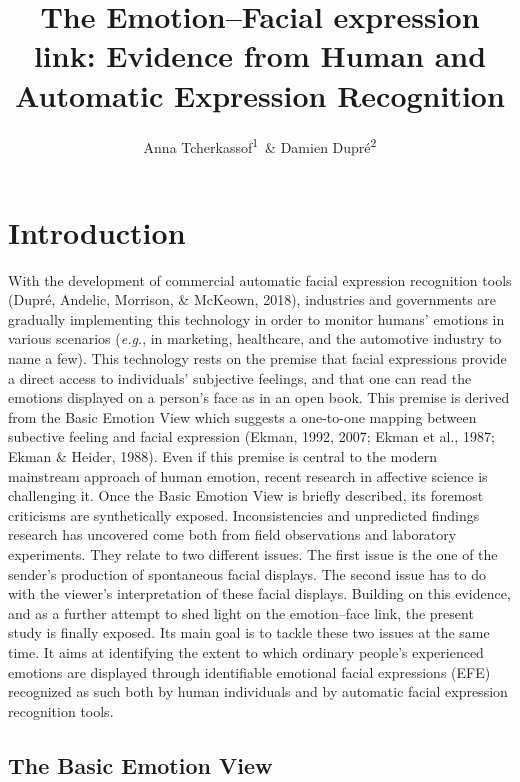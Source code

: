 \documentclass[man]{apa6}
\title{The Emotion--Facial expression link: Evidence from Human and Automatic Expression Recognition}
\author{Anna Tcherkassof\textsuperscript{1}~\& Damien Dupré\textsuperscript{2}}
\date{}
\affiliation{
\vspace{0.5cm}
\textsuperscript{1} University Grenoble Alpes, Grenoble, France\\\textsuperscript{2} Dublin City University, Dublin, Ireland}
\begin{document}
\maketitle

{
\setcounter{tocdepth}{2}
\tableofcontents
}






\hypertarget{introduction}{%
\section{Introduction}\label{introduction}}

With the development of commercial automatic facial expression recognition tools (Dupré, Andelic, Morrison, \& McKeown, 2018), industries and governments are gradually implementing this technology in order to monitor humans' emotions in various scenarios (\emph{e.g.}, in marketing, healthcare, and the automotive industry to name a few). This technology rests on the premise that facial expressions provide a direct access to individuals' subjective feelings, and that one can read the emotions displayed on a person's face as in an open book. This premise is derived from the Basic Emotion View which suggests a one-to-one mapping between subective feeling and facial expression (Ekman, 1992, 2007; Ekman et al., 1987; Ekman \& Heider, 1988). Even if this premise is central to the modern mainstream approach of human emotion, recent research in affective science is challenging it. Once the Basic Emotion View is briefly described, its foremost criticisms are synthetically exposed. Inconsistencies and unpredicted findings research has uncovered come both from field observations and laboratory experiments. They relate to two different issues. The first issue is the one of the sender's production of spontaneous facial displays. The second issue has to do with the viewer's interpretation of these facial displays. Building on this evidence, and as a further attempt to shed light on the emotion--face link, the present study is finally exposed. Its main goal is to tackle these two issues at the same time. It aims at identifying the extent to which ordinary people's experienced emotions are displayed through identifiable emotional facial expressions (EFE) recognized as such both by human individuals and by automatic facial expression recognition tools.

\hypertarget{the-basic-emotion-view}{%
\subsection{The Basic Emotion View}\label{the-basic-emotion-view}}
\end{document}
